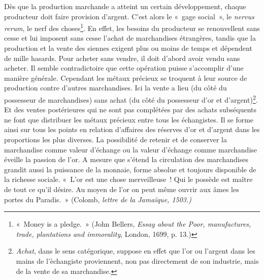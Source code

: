 \documentclass[french,twoside]{book} %
\begin{document}
Dès que la production marchande a atteint un certain développement, chaque producteur doit faire provision d’argent. C’est alors le « gage social », le \emph{nervus rerum}, le nerf des choses\footnote{« Money is a pledge. » (John Bellers, \emph{Essay about the Poor, manufactures, trade, plantations and immorality}, London, 1699, p. 13.)}. En effet, les besoins du producteur se renouvellent sans cesse et lui imposent sans cesse l’achat de marchandises étrangères, tandis que la production et la vente des siennes exigent plus ou moins de temps et dépendent de mille hasards. Pour acheter sans vendre, il doit d’abord avoir vendu sans acheter. Il semble contradictoire que cette opération puisse s’accomplir d’une manière générale. Cependant les métaux précieux se troquent à leur source de production contre d’autres marchandises. Ici la vente a lieu (du côté du possesseur de marchandises) sans achat (du côté du possesseur d’or et d’argent)\footnote{\emph{Achat}, dans le sens catégorique, suppose en effet que l’or ou l’argent dans les mains de l’èchangiste proviennent, non pas directement de son industrie, mais de la vente de sa marchandise.}. Et des ventes postérieures qui ne sont pas complétées par des achats subséquents ne font que distribuer les métaux précieux entre tous les échangistes. Il se forme ainsi sur tous les points en relation d’affaires des réserves d’or et d’argent dans les proportions les plus diverses. La possibilité de retenir et de conserver la marchandise comme valeur d’échange ou la valeur d’échange comme marchandise éveille la passion de l’or. A mesure que s’étend la circulation des marchandises grandit aussi la puissance de la monnaie, forme absolue et toujours disponible de la richesse sociale. « L’or est une chose merveilleuse ! Qui le possède est maître de tout ce qu’il désire. Au moyen de l’or on peut même ouvrir aux âmes les portes du Paradis. » (Colomb, \emph{lettre de la Jamaïque, 1503.)}\par
\end{document}
